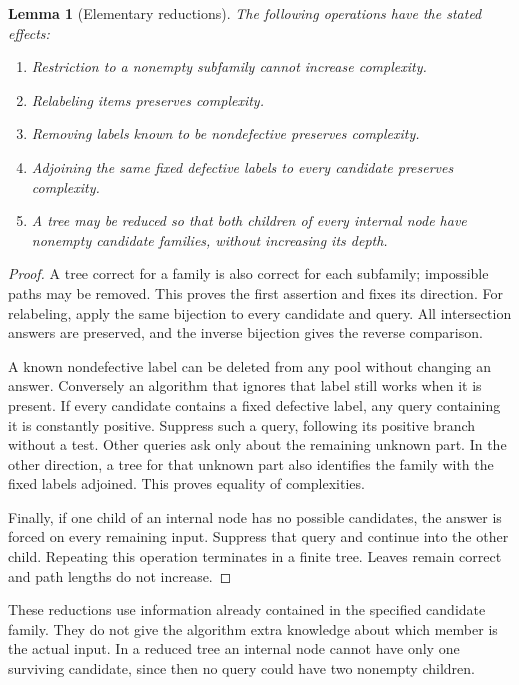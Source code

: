 \documentclass[11pt]{article}
\newtheorem{lemma}[theorem]{Lemma}
\theoremstyle{definition}
\theoremstyle{remark}
\numberwithin{equation}{section}
\begin{document}
\begin{lemma}[Elementary reductions]\label{lem:family}
The following operations have the stated effects:
\begin{enumerate}
\item Restriction to a nonempty subfamily cannot increase complexity.
\item Relabeling items preserves complexity.
\item Removing labels known to be nondefective preserves complexity.
\item Adjoining the same fixed defective labels to every candidate
preserves complexity.
\item A tree may be reduced so that both children of every internal
node have nonempty candidate families, without increasing its depth.
\end{enumerate}
\end{lemma}
\begin{proof}
A tree correct for a family is also correct for each subfamily;
impossible paths may be removed. This proves the first assertion
and fixes its direction.
For relabeling, apply the same bijection to every candidate and query.
All intersection answers are preserved, and the inverse bijection
gives the reverse comparison.

A known nondefective label can be deleted from any pool without
changing an answer. Conversely an algorithm that ignores that label
still works when it is present.
If every candidate contains a fixed defective label, any query
containing it is constantly positive. Suppress such a query, following
its positive branch without a test. Other queries ask only about
the remaining unknown part. In the other direction, a tree for that
unknown part also identifies the family with the fixed labels
adjoined. This proves equality of complexities.

Finally, if one child of an internal node has no possible candidates,
the answer is forced on every remaining input. Suppress that query
and continue into the other child. Repeating this operation terminates
in a finite tree. Leaves remain correct and path lengths do not increase.
\end{proof}

These reductions use information already contained in the specified
candidate family. They do not give the algorithm extra knowledge about
which member is the actual input.
In a reduced tree an internal node cannot have only one surviving
candidate, since then no query could have two nonempty children.
\end{document}
